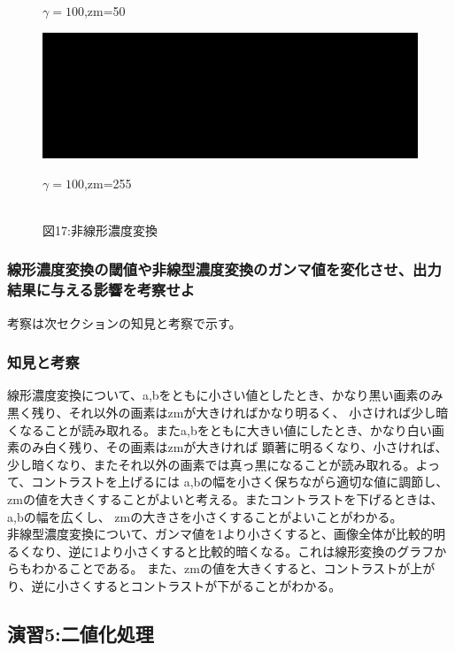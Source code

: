 ﻿\documentclass[a4j,11pt]{jarticle}
\begin{document}
\begin{figure}[tb]
\begin{minipage}{0.49\hsize}
   $\gamma=100$,zm=50
 \end{minipage}
 \begin{minipage}{0.49\hsize} %
   \center
   \includegraphics[width=\hsize]{./eps/contrast-notlinear-highhigh.eps}

   $\gamma=100$,zm=255
 \end{minipage}
 \\図17:非線形濃度変換
 \label{fig:affine2}
\end{figure}
\subsubsection{線形濃度変換の閾値や非線型濃度変換のガンマ値を変化させ、出力結果に与える影響を考察せよ}
考察は次セクションの知見と考察で示す。
\subsubsection{知見と考察}
線形濃度変換について、a,bをともに小さい値としたとき、かなり黒い画素のみ黒く残り、それ以外の画素はzmが大きければかなり明るく、
小さければ少し暗くなることが読み取れる。またa,bをともに大きい値にしたとき、かなり白い画素のみ白く残り、その画素はzmが大きければ
顕著に明るくなり、小さければ、少し暗くなり、またそれ以外の画素では真っ黒になることが読み取れる。よって、コントラストを上げるには
a,bの幅を小さく保ちながら適切な値に調節し、zmの値を大きくすることがよいと考える。またコントラストを下げるときは、a,bの幅を広くし、
zmの大きさを小さくすることがよいことがわかる。\\
非線型濃度変換について、ガンマ値を1より小さくすると、画像全体が比較的明るくなり、逆に1より小さくすると比較的暗くなる。これは線形変換のグラフからもわかることである。
また、zmの値を大きくすると、コントラストが上がり、逆に小さくするとコントラストが下がることがわかる。
\subsection{演習5:二値化処理}
\end{document}
